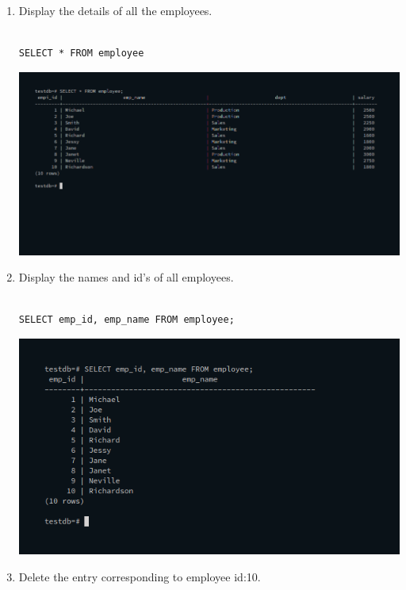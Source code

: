 \begin{enumerate}
\item Display the details of all the employees.\newline
\begin{verbatim}

SELECT * FROM employee

\end{verbatim}
\newline
\includegraphics[width=\linewidth]{../Images/Basics/1.png}\newline
\item Display the names and id’s of all employees.\newline
\begin{verbatim}

SELECT emp_id, emp_name FROM employee;

\end{verbatim}
\newline
\includegraphics[width=\linewidth]{../Images/Basics/2.png}\newline
\item Delete the entry corresponding to employee id:10.\newline
\begin{verbatim}


\end{verbatim}
\end{enumerate}
